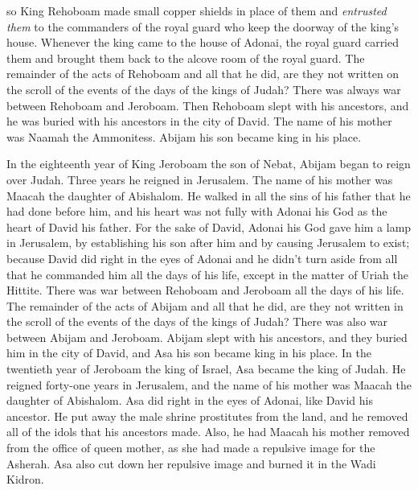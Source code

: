 \begin{biblechapter}
\verse so King Rehoboam made small copper shields in place of them and \textit{entrusted them} to the commanders of the royal guard who keep the doorway of the king’s house.
\verse Whenever the king came to the house of Adonai, the royal guard carried them and brought them back to the alcove room of the royal guard.
\verse The remainder of the acts of Rehoboam and all that he did, are they not written on the scroll of the events of the days of the kings of Judah?
\verse There was always war between Rehoboam and Jeroboam.
\verse Then Rehoboam slept with his ancestors, and he was buried with his ancestors in the city of David. The name of his mother was Naamah the Ammonitess. Abijam his son became king in his place.
\end{biblechapter}

\begin{biblechapter} %
 In the eighteenth year of King Jeroboam the son of Nebat, Abijam began to reign over Judah.
\verse Three years he reigned in Jerusalem. The name of his mother was Maacah the daughter of Abishalom.
\verse He walked in all the sins of his father that he had done before him, and his heart was not fully with Adonai his God as the heart of David his father.
\verse For the sake of David, Adonai his God gave him a lamp in Jerusalem, by establishing his son after him and by causing Jerusalem to exist;
\verse because David did right in the eyes of Adonai and he didn’t turn aside from all that he commanded him all the days of his life, except in the matter of Uriah the Hittite.
\verse There was war between Rehoboam and Jeroboam all the days of his life.
\verse The remainder of the acts of Abijam and all that he did, are they not written in the scroll of the events of the days of the kings of Judah? There was also war between Abijam and Jeroboam.
\verse Abijam slept with his ancestors, and they buried him in the city of David, and Asa his son became king in his place.
 In the twentieth year of Jeroboam the king of Israel, Asa became the king of Judah.
\verse He reigned forty-one years in Jerusalem, and the name of his mother was Maacah the daughter of Abishalom.
\verse Asa did right in the eyes of Adonai, like David his ancestor.
\verse He put away the male shrine prostitutes from the land, and he removed all of the idols that his ancestors made.
\verse Also, he had Maacah his mother removed from the office of queen mother, as she had made a repulsive image for the Asherah. Asa also cut down her repulsive image and burned it in the Wadi Kidron.

\end{biblechapter}
